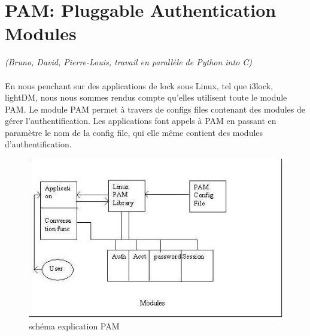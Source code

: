 \documentclass{article}
\begin{document}
  \section{PAM: Pluggable Authentication Modules} \emph{(Bruno, David,
  Pierre-Louis, travail en parallèle de Python into C)}\\ \\
En nous penchant sur des applications de lock sous Linux, tel que i3lock,
lightDM, nous nous sommes rendus compte qu’elles utilisent toute le module
PAM.
Le module PAM permet à travers de configs files contenant des modules de
gérer l’authentification. Les applications font appels à PAM en passant en
paramètre le nom de la config file, qui elle même contient des modules
d’authentification.

  \begin{figure}[h]
    \begin{center}
    \includegraphics[width=0.8\linewidth]{./pam}
    \caption{schéma explication PAM}
  \end{center}
  \end{figure}
\end{document}
